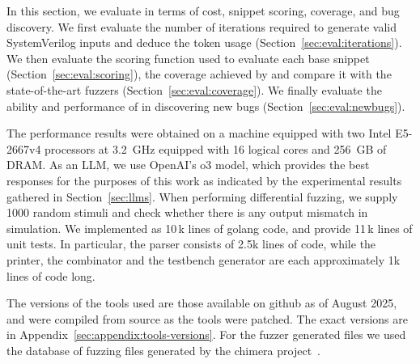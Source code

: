 In this section, we evaluate \ourname in terms of cost, snippet scoring, coverage, and bug discovery.
We first evaluate the number of iterations required to generate valid SystemVerilog inputs and deduce the token usage (Section~\ref{sec:eval:iterations}).
We then evaluate the scoring function used to evaluate each base snippet (Section~\ref{sec:eval:scoring}),
the coverage achieved by \ourname and compare it with the state-of-the-art fuzzers (Section~\ref{sec:eval:coverage}).
We finally evaluate the ability and performance of \ourname in discovering new bugs (Section~\ref{sec:eval:newbugs}).

The performance results were obtained on a machine equipped with two Intel E5-2667v4 processors at 3.2~GHz equipped with 16 logical cores and 256~GB of DRAM.
As an LLM, we use OpenAI's o3 model, which provides the best responses for the purposes of this work as indicated by the experimental results gathered in Section~\ref{sec:llms}.
When performing differential fuzzing, we supply 1000 random stimuli and check whether there is any output mismatch in simulation.
We implemented \ourname as 10\,k lines of golang code, and provide 11\,k lines of unit tests.
In particular, the parser consists of 2.5k lines of code, while the printer, the combinator and the testbench generator are each approximately 1k lines of code long.

The versions of the tools used are those available on github as of August 2025, and were compiled from source as the tools were patched.
The exact versions are in Appendix~\ref{sec:appendix:tools-versions}.
For the fuzzer generated files we used the database of fuzzing files generated by the chimera project~\cite{chibench}.



